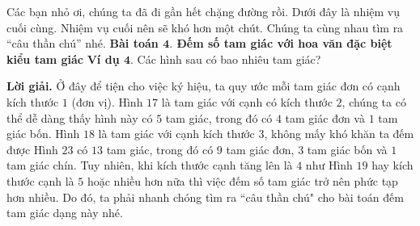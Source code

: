 \newpage
{}
\everymath{\color{toancuabi}}
\graphicspath{{../timhieucungbi/demtamgiac2/}}

Các bạn nhỏ ơi, chúng ta đã đi gần hết chặng đường rồi. Dưới đây là nhiệm vụ cuối cùng. Nhiệm vụ cuối nên sẽ khó hơn một chút. Chúng ta cùng nhau tìm ra “câu thần chú” nhé. 
\vskip 0.1cm
{\bf\color{toancuabi} Bài toán $\pmb{4.}$ Đếm số tam giác với hoa văn đặc biệt kiểu tam giác}
\vskip 0.1cm
{\bf\color{toancuabi} Ví dụ $\pmb{4.}$} Các hình sau có bao nhiêu tam giác?
	\begin{figure}[H]
	\centering
	\vspace*{-5pt}
	\captionsetup{labelformat= empty, justification=centering}
	\captionsetup[subfigure]{labelformat=empty}
	\hfill{}
	\hfill
	\hfill{}
	\hfill
	\vspace*{-10pt}
\end{figure}
{\bf\color{toancuabi} Lời giải.}
\vskip 0.1cm
Ở đây để tiện cho việc ký hiệu, ta quy ước mỗi tam giác đơn có cạnh kích thước $1$ (đơn vị).
\vskip 0.1cm
Hình $17$ là tam giác với cạnh có kích thước $2$, chúng ta có thể dễ dàng thấy hình này có $5$ tam giác, trong đó có $4$ tam giác đơn và $1$ tam giác bốn.
\vskip 0.1cm
Hình $18$ là tam giác với cạnh kích thước $3$, không mấy khó khăn ta đếm được Hình $23$ có $13$ tam giác, trong đó có $9$ tam giác đơn, $3$ tam giác bốn và $1$ tam giác chín.
\vskip 0.1cm
Tuy nhiên, khi kích thước cạnh tăng lên là $4$ như Hình $19$ hay kích thước cạnh là $5$ hoặc nhiều hơn nữa thì việc đếm số tam giác trở nên phức tạp hơn nhiều. Do đó, ta phải nhanh chóng tìm ra ``câu thần chú" cho bài toán đếm tam giác dạng này nhé. 
